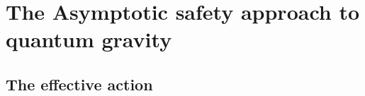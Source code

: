 \documentclass[11pt, a4paper]{article}
\newcommand{\jhk}[1]{{\color{red}#1}}
\begin{document}

\section{\jhk{The} Asymptotic safety \jhk{approach to quantum gravity}}
\jhk{\subsection{The effective action}}
\end{document}
